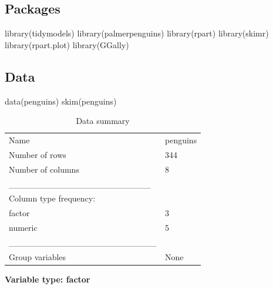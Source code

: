 \documentclass[
  letterpaper,
  DIV=11,
  numbers=noendperiod]{scrreprt}
\newenvironment{Shaded}{\begin{snugshade}}{\end{snugshade}}
\newcommand{\FunctionTok}[1]{\textcolor[rgb]{0.28,0.35,0.67}{#1}}
\newcommand{\NormalTok}[1]{\textcolor[rgb]{0.00,0.23,0.31}{#1}}
\begin{document}
\subsection{Packages}\label{packages-1}

\begin{Shaded}
\begin{Highlighting}[]
\FunctionTok{library}\NormalTok{(tidymodels)}
\FunctionTok{library}\NormalTok{(palmerpenguins)}
\FunctionTok{library}\NormalTok{(rpart)}
\FunctionTok{library}\NormalTok{(skimr)}
\FunctionTok{library}\NormalTok{(rpart.plot)}
\FunctionTok{library}\NormalTok{(GGally)}
\end{Highlighting}
\end{Shaded}

\subsection{Data}\label{data}

\begin{Shaded}
\begin{Highlighting}[]
\FunctionTok{data}\NormalTok{(penguins)}
\FunctionTok{skim}\NormalTok{(penguins)}
\end{Highlighting}
\end{Shaded}

\begin{longtable}[]{@{}ll@{}}
\caption{Data summary}\tabularnewline
\toprule\noalign{}
\endfirsthead
\endhead
\bottomrule\noalign{}
\endlastfoot
Name & penguins \\
Number of rows & 344 \\
Number of columns & 8 \\
\_\_\_\_\_\_\_\_\_\_\_\_\_\_\_\_\_\_\_\_\_\_\_ & \\
Column type frequency: & \\
factor & 3 \\
numeric & 5 \\
\_\_\_\_\_\_\_\_\_\_\_\_\_\_\_\_\_\_\_\_\_\_\_\_ & \\
Group variables & None \\
\end{longtable}

\textbf{Variable type: factor}
\end{document}

